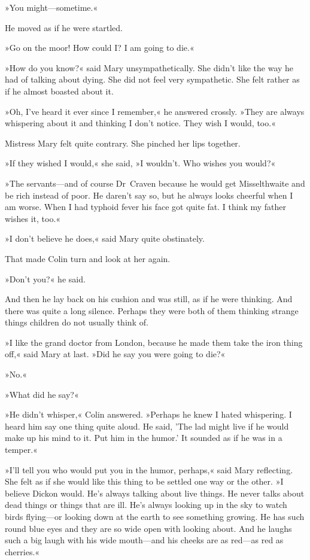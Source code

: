 »You might—sometime.«

He moved as if he were startled.

»Go on the moor! How could I? I am going to die.«

»How do you know?« said Mary unsympathetically. She didn't like the way he had of talking about dying. She did not feel very sympathetic. She felt rather as if he almost boasted about it.

»Oh, I've heard it ever since I remember,« he answered crossly. »They are always whispering about it and thinking I don't notice. They wish I would, too.«

Mistress Mary felt quite contrary. She pinched her lips together.

»If they wished I would,« she said, »I wouldn't. Who wishes you would?«

»The servants—and of course Dr~Craven because he would get Misselthwaite and be rich instead of poor. He daren't say so, but he always looks cheerful when I am worse. When I had typhoid fever his face got quite fat. I think my father wishes it, too.«

»I don't believe he does,« said Mary quite obstinately.

That made Colin turn and look at her again.

»Don't you?« he said.

And then he lay back on his cushion and was still, as if he were thinking. And there was quite a long silence. Perhaps they were both of them thinking strange things children do not usually think of.

»I like the grand doctor from London, because he made them take the iron thing off,« said Mary at last. »Did he say you were going to die?«

»No.«

»What did he say?«

»He didn't whisper,« Colin answered. »Perhaps he knew I hated whispering. I heard him say one thing quite aloud. He said, 'The lad might live if he would make up his mind to it. Put him in the humor.' It sounded as if he was in a temper.«

»I'll tell you who would put you in the humor, perhaps,« said Mary reflecting. She felt as if she would like this thing to be settled one way or the other. »I believe Dickon would. He's always talking about live things. He never talks about dead things or things that are ill. He's always looking up in the sky to watch birds flying—or looking down at the earth to see something growing. He has such round blue eyes and they are so wide open with looking about. And he laughs such a big laugh with his wide mouth—and his cheeks are as red—as red as cherries.«

